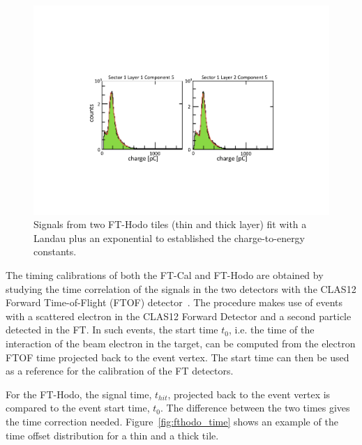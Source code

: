 \begin{figure}
\includegraphics[width=1.0\columnwidth]{fig/fthodo_mips.pdf}
\caption{Signals from two FT-Hodo tiles (thin and thick layer) fit with a Landau plus an exponential to established
  the charge-to-energy constants.}
\label{fig:fthodo_mips}
\end{figure}

The timing calibrations of both the FT-Cal and FT-Hodo are obtained by studying the time correlation of the signals
in the two detectors with the CLAS12 Forward Time-of-Flight (FTOF) detector~\cite{ftof}. The procedure makes
use of events with a scattered electron in the CLAS12 Forward Detector and a second particle detected in the
FT. In such events, the start time $t_0$, i.e. the time of the  interaction of the beam electron in the target, can be
computed from the electron FTOF time projected back to the event vertex. The start time can then be used as a
reference for the calibration of the FT detectors. 

For the FT-Hodo, the signal time, $t_{hit}$, projected back to the event vertex is compared to the event start time,
$t_0$. The difference between the two times gives the time correction needed. Figure~\ref{fig:fthodo_time} shows
an example of the time offset distribution for a thin and a thick tile.

